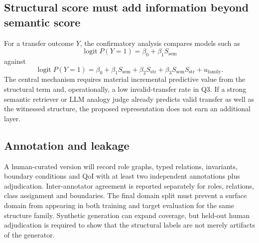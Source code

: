 \subsection{Structural score must add information beyond semantic score}

For a transfer outcome $Y$, the confirmatory analysis compares models such as
\[
\operatorname{logit}P(Y=1)=\beta_0+\beta_1 S_{\mathrm{sem}}
\]
against
\[
\operatorname{logit}P(Y=1)=\beta_0+\beta_1 S_{\mathrm{sem}}+\beta_2 S_{\mathrm{str}}+\beta_3S_{\mathrm{sem}}S_{\mathrm{str}}+u_{\mathrm{family}}.
\]
The central mechanism requires material incremental predictive value from the structural term and, operationally, a low invalid-transfer rate in Q3. If a strong semantic retriever or LLM analogy judge already predicts valid transfer as well as the witnessed structure, the proposed representation does not earn an additional layer.

\subsection{Annotation and leakage}

A human-curated version will record role graphs, typed relations, invariants, boundary conditions and QoI with at least two independent annotations plus adjudication. Inter-annotator agreement is reported separately for roles, relations, class assignment and boundaries. The final domain split must prevent a surface domain from appearing in both training and target evaluation for the same structure family. Synthetic generation can expand coverage, but held-out human adjudication is required to show that the structural labels are not merely artifacts of the generator.
